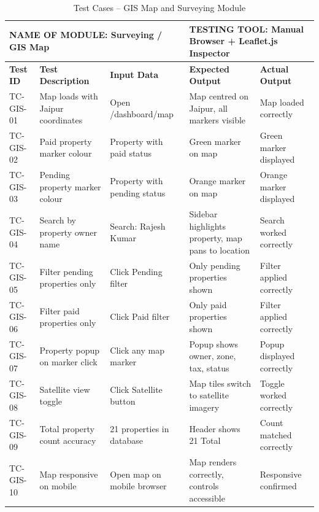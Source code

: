 \begin{table}[H]
\begin{center}
 \begin{tabular}{| m{1.2cm} | m{3.5cm} | m{2.2cm}| m{3cm}|m{3cm}| } 
\hline
\multicolumn{3}{|l|}{NAME OF MODULE: Surveying / GIS Map}&
\multicolumn{2}{|l|}{TESTING TOOL: Manual Browser + Leaflet.js Inspector}\\[0.8cm]
\hline
\textbf{Test ID} & \textbf{Test Description} & \textbf{Input Data} & \textbf{Expected Output} & \textbf{Actual Output} \\ 
\hline
TC-GIS-01 & Map loads with Jaipur coordinates & Open /dashboard/map & Map centred on Jaipur, all markers visible & Map loaded correctly \\
\hline
TC-GIS-02 & Paid property marker colour & Property with paid status & Green marker on map & Green marker displayed \\
\hline
TC-GIS-03 & Pending property marker colour & Property with pending status & Orange marker on map & Orange marker displayed \\
\hline
TC-GIS-04 & Search by property owner name & Search: Rajesh Kumar & Sidebar highlights property, map pans to location & Search worked correctly \\
\hline
TC-GIS-05 & Filter pending properties only & Click Pending filter & Only pending properties shown & Filter applied correctly \\
\hline
TC-GIS-06 & Filter paid properties only & Click Paid filter & Only paid properties shown & Filter applied correctly \\
\hline
TC-GIS-07 & Property popup on marker click & Click any map marker & Popup shows owner, zone, tax, status & Popup displayed correctly \\
\hline
TC-GIS-08 & Satellite view toggle & Click Satellite button & Map tiles switch to satellite imagery & Toggle worked correctly \\
\hline
TC-GIS-09 & Total property count accuracy & 21 properties in database & Header shows 21 Total & Count matched correctly \\
\hline
TC-GIS-10 & Map responsive on mobile & Open map on mobile browser & Map renders correctly, controls accessible & Responsive confirmed \\
\hline
\end{tabular}
\caption{Test Cases -- GIS Map and Surveying Module}
\end{center}
\end{table}
